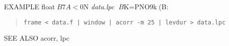 
\begin{qsection}{EXAMPLE}
float$B7A<0$N%
{\em data.lpc} $B$K=PNO$9$k(B:
\begin{quote}
 \verb!frame < data.f | window | acorr -m 25 | levdur > data.lpc!
\end{quote} 
\end{qsection}

\begin{qsection}{SEE ALSO}
 acorr, lpc
\end{qsection}
